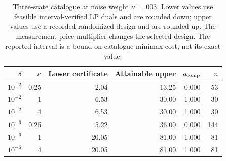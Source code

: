 \begin{table}[htbp]
\centering\small
\begin{tabular}{rrrrrr}
\toprule
$\delta$ & $\kappa$ & Lower certificate & Attainable upper & $q_{\rm comp}$ & $n$\\
\midrule
$10^{-2}$ & 0.25 & 2.04 & 13.25 & 0.000 & 53\\
$10^{-2}$ & 1 & 6.53 & 30.00 & 1.000 & 30\\
$10^{-2}$ & 4 & 6.53 & 30.00 & 1.000 & 30\\
$10^{-6}$ & 0.25 & 5.22 & 36.00 & 0.000 & 144\\
$10^{-6}$ & 1 & 20.05 & 81.00 & 1.000 & 81\\
$10^{-6}$ & 4 & 20.05 & 81.00 & 1.000 & 81\\
\bottomrule\end{tabular}
\caption{Three-state catalogue at noise weight $\nu=.003$. Lower values use feasible interval-verified LP duals and are rounded down;
upper values use a recorded randomized design and are rounded up. The measurement-price multiplier changes the selected design.
The reported interval is a bound on catalogue minimax cost, not its exact value.}
\label{tab:multihypothesis}
\end{table}

